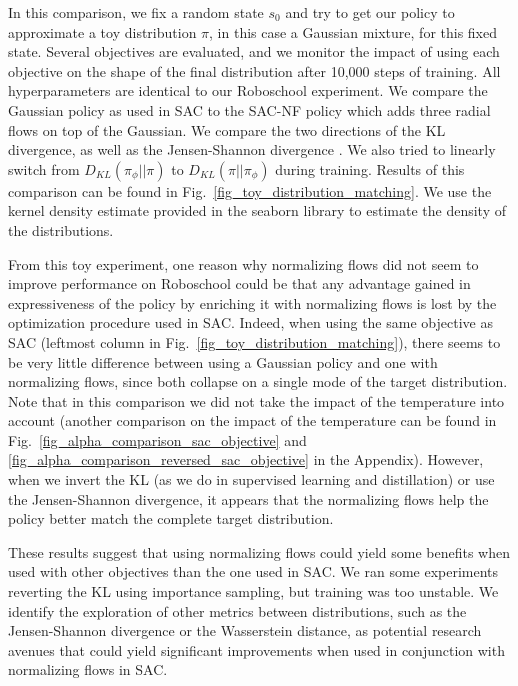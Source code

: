 \documentclass[letterpaper]{article} \usepackage{aaai20}  \usepackage{times}  \usepackage{helvet} \usepackage{courier}  \usepackage[hyphens]{url}  \usepackage{graphicx} \urlstyle{rm} \def\UrlFont{\rm}  \usepackage{graphicx}  \usepackage[section]{placeins}
\begin{document}
In this comparison, we fix a random state $s_0$ and try to get our policy to approximate a toy distribution $\pi$, in this case a Gaussian mixture, for this fixed state. Several objectives are evaluated, and we monitor the impact of using each objective on the shape of the final distribution after 10,000 steps of training. All hyperparameters are identical to our Roboschool experiment. We compare the Gaussian policy as used in SAC to the SAC-NF policy which adds three radial flows on top of the Gaussian. We compare the two directions of the KL divergence, as well as the Jensen-Shannon divergence \cite{lin1991divergence}. We also tried to linearly switch from $D_{KL}(\pi_{\phi} || \pi)$ to $D_{KL}(\pi || \pi_{\phi})$ during training. Results of this comparison can be found in Fig.~\ref{fig_toy_distribution_matching}. We use the kernel density estimate provided in the seaborn library \cite{waskom2018seaborn} to estimate the density of the distributions. 

From this toy experiment, one reason why normalizing flows did not seem to improve performance on Roboschool could be that any advantage gained in expressiveness of the policy by enriching it with normalizing flows is lost by the optimization procedure used in SAC. Indeed, when using the same objective as SAC (leftmost column in Fig.~\ref{fig_toy_distribution_matching}), there seems to be very little difference between using a Gaussian policy and one with normalizing flows, since both collapse on a single mode of the target distribution. Note that in this comparison we did not take the impact of the temperature into account (another comparison on the impact of the temperature can be found in Fig.~\ref{fig_alpha_comparison_sac_objective} and \ref{fig_alpha_comparison_reversed_sac_objective} in the Appendix). However, when we invert the KL (as we do in supervised learning and distillation) or use the Jensen-Shannon divergence, it appears that the normalizing flows help the policy better match the complete target distribution.

These results suggest that using normalizing flows could yield some benefits when used with other objectives than the one used in SAC. We ran some experiments reverting the KL using importance sampling, but training was too unstable. We identify the exploration of other metrics between distributions, such as the Jensen-Shannon divergence or the Wasserstein distance, as potential research avenues that could yield significant improvements when used in conjunction with normalizing flows in SAC.
\end{document}
